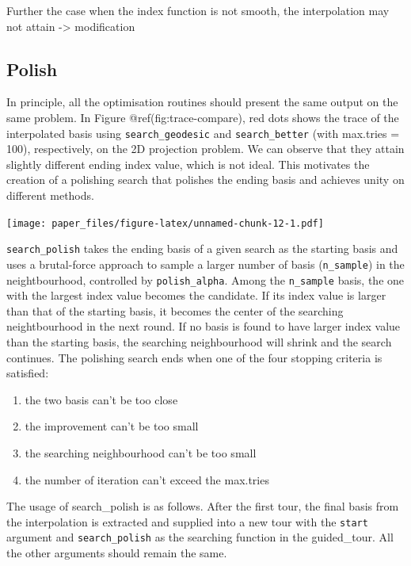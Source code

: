 \documentclass[12pt]{article}
\providecommand{\tightlist}{%
  \setlength{\itemsep}{0pt}\setlength{\parskip}{0pt}}
\begin{document}
Further the case when the index function is not smooth, the
interpolation may not attain -\textgreater{} modification

\hypertarget{polish}{%
\subsection{Polish}\label{polish}}

In principle, all the optimisation routines should present the same
output on the same problem. In Figure @ref(fig:trace-compare), red dots
shows the trace of the interpolated basis using
\texttt{search\_geodesic} and \texttt{search\_better} (with max.tries =
100), respectively, on the 2D projection problem. We can observe that
they attain slightly different ending index value, which is not ideal.
This motivates the creation of a polishing search that polishes the
ending basis and achieves unity on different methods.

\texttt{[image: paper\_files/figure-latex/unnamed-chunk-12-1.pdf]}

\texttt{search\_polish} takes the ending basis of a given search as the
starting basis and uses a brutal-force approach to sample a larger
number of basis (\texttt{n\_sample}) in the neightbourhood, controlled
by \texttt{polish\_alpha}. Among the \texttt{n\_sample} basis, the one
with the largest index value becomes the candidate. If its index value
is larger than that of the starting basis, it becomes the center of the
searching neightbourhood in the next round. If no basis is found to have
larger index value than the starting basis, the searching neighbourhood
will shrink and the search continues. The polishing search ends when one
of the four stopping criteria is satisfied:

\begin{enumerate}
\def\labelenumi{\arabic{enumi})}
\tightlist
\item
  the two basis can't be too close
\item
  the improvement can't be too small
\item
  the searching neighbourhood can't be too small
\item
  the number of iteration can't exceed the max.tries
\end{enumerate}

The usage of search\_polish is as follows. After the first tour, the
final basis from the interpolation is extracted and supplied into a new
tour with the \texttt{start} argument and \texttt{search\_polish} as the
searching function in the guided\_tour. All the other arguments should
remain the same.
\end{document}
